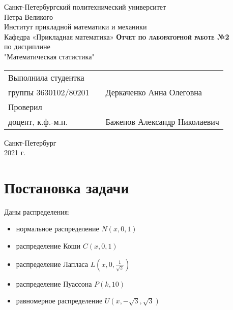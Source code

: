 \documentclass[12pt,a4paper]{article}
\begin{document}
    \begin{titlepage}
        \begin{center}
            \large
            Санкт-Петербургский политехнический университет\\Петра Великого\\
            \vspace{0.5cm}
            Институт прикладной математики и механики\\
            \vspace{0.25cm}
            Кафедра «Прикладная математика»
            \vfill
            \textsc{\LARGE\textbf{Отчет по лабораторной работе №2}}\\[5mm]
            \Large
            по дисциплине\\"Математическая статистика"
        \end{center}
        \vfill
        \begin{tabular}{l p{} l}
            Выполнила студентка\\группы 3630102/80201 && Деркаченко Анна Олеговна
            \vspace{0.25cm}
            \\Проверил\\доцент, к.ф.-м.н. && Баженов Александр Николаевич
        \end{tabular}
        \vfill
        \begin{center}
            Санкт-Петербург\\2021 г.
        \end{center}
    \end{titlepage}

\newpage
\begin{center}
    \tableofcontents
    \setcounter{page}{2}
\end{center}
\newpage
\begin{center}
    \listoffigures
\end{center}

\newpage
\section{Постановка задачи}
Даны распределения:
\begin{itemize}
    \item нормальное распределение $N(x,0,1)$
    \item распределение Коши $C(x,0,1)$
    \item распределение Лапласа $L(x,0,\frac{1}{\sqrt{2}})$
    \item распределение Пуассона $P(k,10)$
    \item равномерное распределение $U(x,-\sqrt{3},\sqrt{3})$
\end{itemize}
\end{document}
